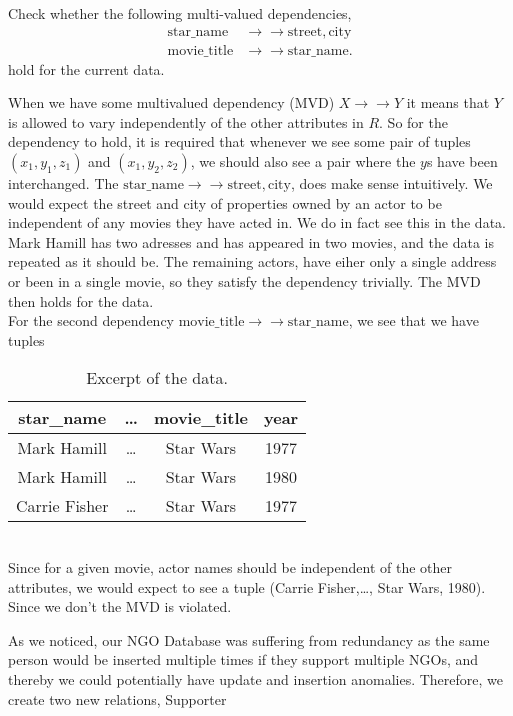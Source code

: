 \documentclass[working, oneside]{../../Preambles/tuftebook}
\begin{document}
\begin{exercise}
Check whether the following multi-valued dependencies,
\begin{align*}
    \text{star\_name} &\to \to \text{street}, \text{city}\\
    \text{movie\_title} &\to \to \text{star\_name}
.\end{align*}
hold for the current data.
\end{exercise}
When we have some multivalued dependency (MVD) $X \to \to Y$ it means that $Y$ is allowed to vary independently of the other attributes in $R$. So for the dependency to hold, it is required that whenever we see some pair of tuples $ \left( x_1, y_1, z_1 \right) $ and $\left( x_1, y_2, z_2 \right) $, we should also see a pair where the $y$s have been interchanged. The $\text{star\_name} \to \to \text{street}, \text{city}$, does make sense intuitively. We would expect the street and city of properties owned by an actor to be independent of any movies they have acted in. We do in fact see this in the data. Mark Hamill has two adresses and has appeared in two movies, and the data is repeated as it should be. The remaining actors, have eiher only a single address or been in a single movie, so they satisfy the dependency trivially. The MVD then holds for the data.\\
For the second dependency $\text{movie\_title} \to \to \text{star\_name}$, we see that we have tuples
\begin{table}[htpb]
    \centering
    \caption{Excerpt of the data.}
    \label{tab:label}
    \begin{tabular}{c|c|c|c}
        star\_name & \ldots & movie\_title & year \\ \hline
        Mark Hamill & \ldots & Star Wars & 1977 \\
        Mark Hamill & \ldots & Star Wars & 1980 \\
        Carrie Fisher & \ldots & Star Wars & 1977 \\
    \end{tabular}
\end{table} \\
Since for a given movie, actor names should be independent of the other attributes, we would expect to see a tuple (Carrie Fisher,\ldots , Star Wars, 1980). Since we don't the MVD is violated.
\begin{exercise}[3 - NGO]
As we noticed, our NGO Database was suffering from redundancy as the same person would
be inserted multiple times if they support multiple NGOs, and thereby we could potentially
have update and insertion anomalies. Therefore, we create two new relations, Supporter
\end{exercise}
\end{document}
